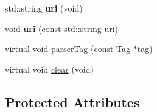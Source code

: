 \begin{DoxyCompactItemize}
\item 
\hypertarget{classGeoloc_a6836646c2bbe41b1e0f5a82ad6a53b67}{
std::string {\bfseries uri} (void)}
\label{classGeoloc_a6836646c2bbe41b1e0f5a82ad6a53b67}

\item 
\hypertarget{classGeoloc_aa1cfddd4bc99d4d03c576e46520b318a}{
void {\bfseries uri} (const std::string uri)}
\label{classGeoloc_aa1cfddd4bc99d4d03c576e46520b318a}

\item 
virtual void \hyperlink{classGeoloc_aee41efc57fd8fce9c46c72d447c46830}{parserTag} (const Tag $\ast$tag)
\item 
virtual void \hyperlink{classGeoloc_a83844d55e0b53be3131a6fcfceb3dbb9}{clear} (void)
\end{DoxyCompactItemize}
\subsection*{Protected Attributes}
